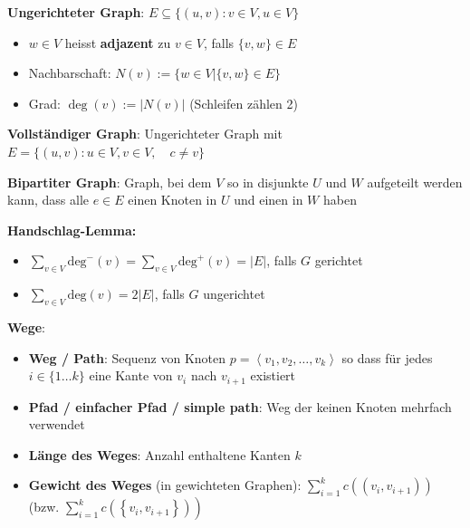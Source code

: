 \vspace{-4pt}
\begin{sectionbox}
\textbf{Ungerichteter Graph}: $E \subseteq \{(u, v): v \in V, u \in V\}$\par
\begin{itemize}
    \item $w \in V$ heisst \textbf{adjazent} zu $v \in V$, falls $\{v, w\} \in E$
    \item Nachbarschaft: $N(v):=\{w \in V |\{v, w\} \in E\}$
    \item Grad: $\operatorname{deg}(v):=|N(v)|$ (Schleifen zählen 2)
\end{itemize}\par\smallskip

\end{sectionbox}
\vspace{-4pt}
\begin{sectionbox}

\textbf{Vollständiger Graph}: Ungerichteter Graph mit  $E=\{(u, v): u \in V, v \in V, \quad c \neq v\}$\par\smallskip
\textbf{Bipartiter Graph}: Graph, bei dem $V$ so in disjunkte $U$ und $W$ aufgeteilt werden kann, dass alle $e \in E$ einen Knoten in $U$ und einen in $W$ haben\par
\end{sectionbox}
\vspace{-4pt}
\begin{sectionbox}
\textbf{Handschlag-Lemma:}
\begin{itemize}
    \item $\sum_{v \in V}\limits \text{deg}^- (v) = \sum_{v \in V} \text{deg}^+ (v) = |E|$, falls $G$ gerichtet
    \item $\sum_{v \in V}\limits \text{deg} (v) = 2 |E|$, falls $G$ ungerichtet
\end{itemize}
\end{sectionbox}
\vspace{-4pt}
\begin{sectionbox}
\textbf{Wege}:\par
\begin{itemize}
    \item \textbf{Weg / Path}: Sequenz von Knoten $p=\left\langle v_{1}, v_{2}, \ldots, v_{k}\right\rangle$ so dass für jedes $i \in\{1 \ldots k\}$ eine Kante von $v_{i}$ nach $v_{i+1}$ existiert
    \item \textbf{Pfad / einfacher Pfad / simple path}: Weg der keinen Knoten mehrfach verwendet
    \item \textbf{Länge des Weges}: Anzahl enthaltene Kanten $k$
    \item \textbf{Gewicht des Weges} (in gewichteten Graphen): $\sum_{i=1}^{k} c\left(\left(v_{i}, v_{i+1}\right)\right)$ (bzw. $\left.\sum_{i=1}^{k} c\left(\left\{v_{i}, v_{i+1}\right\}\right)\right)$
\end{itemize}\par\smallskip

\end{sectionbox}
